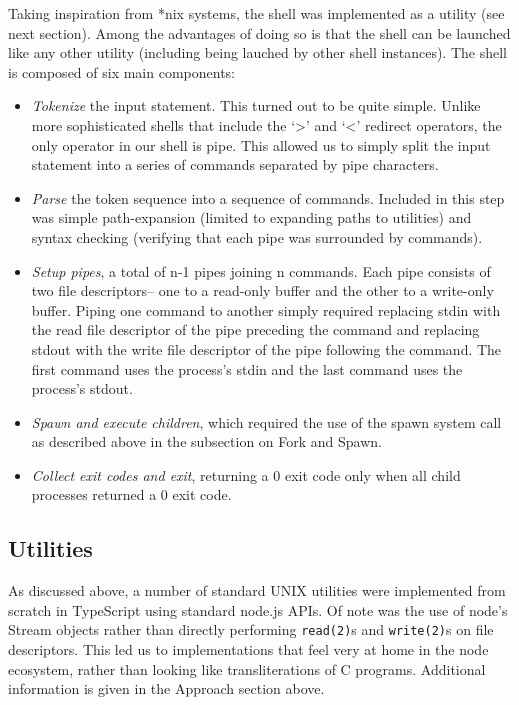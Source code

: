 \documentclass{acm_proc_article-sp}
\begin{document}
Taking inspiration from *nix systems, the shell was implemented as a
utility (see next section).  Among the advantages of doing so is that
the shell can be launched like any other utility (including being lauched
by other shell instances).  The shell is composed of six main components:
\begin{itemize}
\item \emph{Tokenize} the input statement. This turned out to be quite
  simple. Unlike more sophisticated shells that include the `>' and `<'
  redirect operators, the only operator in our shell is pipe. This allowed
  us to simply split the input statement into a series of commands separated
  by pipe characters.
\item \emph{Parse} the token sequence into a sequence of commands.
  Included in this step was simple path-expansion (limited to expanding paths
  to utilities) and syntax checking (verifying that each pipe was surrounded
  by commands).
\item \emph{Setup pipes}, a total of n-1 pipes joining n commands. Each pipe consists
  of two file descriptors-- one to a read-only buffer and the other to a
  write-only buffer.  Piping one command to another simply required replacing stdin with
  the read file descriptor of the pipe preceding the command and replacing stdout with the
  write file descriptor of the pipe following the command.  The first command uses the
  process's stdin and the last command uses the process's stdout.
\item \emph{Spawn and execute children}, which required the use of the spawn system call
  as described above in the subsection on Fork and Spawn.
\item \emph{Collect exit codes and exit}, returning a 0 exit code only when all child
  processes returned a 0 exit code.
\end{itemize}

\subsection{Utilities}

As discussed above, a number of standard UNIX utilities were
implemented from scratch in TypeScript using standard node.js APIs.
Of note was the use of node's Stream objects rather than directly
performing \texttt{read(2)}s and \texttt{write(2)}s on file
descriptors.  This led us to implementations that feel very at home in
the node ecosystem, rather than looking like transliterations of C
programs.  Additional information is given in the Approach section
above.
\end{document}
